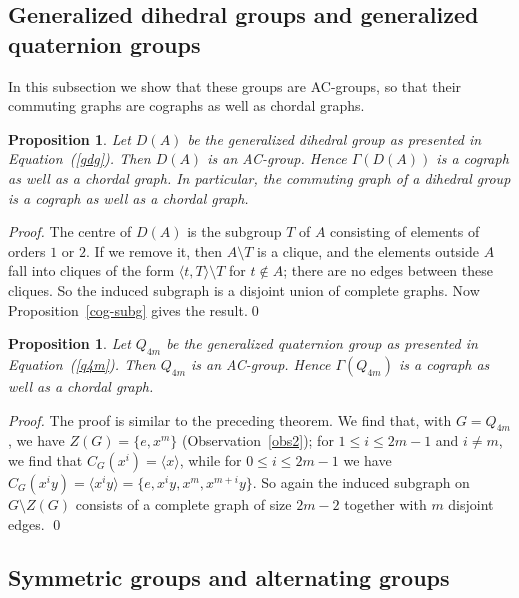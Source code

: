 \documentclass{elsarticle}
\newtheorem{prop}[theorem]{Proposition}
\begin{document}
\subsection{Generalized dihedral groups and generalized quaternion groups}

In this subsection we show that these groups are AC-groups, so that their
commuting graphs are cographs as well as chordal graphs.

\begin{prop}\label{gdg-thm}
Let $D(A)$ be the generalized dihedral group as presented in
Equation~(\ref{gdg}). Then $D(A)$ is an AC-group. Hence $\Gamma(D(A))$ is a
cograph as well as a chordal graph. In particular, the commuting graph of a
dihedral group is a cograph as well as a chordal graph.
\end{prop}

\begin{proof}
The centre of $D(A)$ is the subgroup $T$ of $A$ consisting of elements of orders $1$ or $2$. If we remove it, then $A\setminus T$ is a clique, and the elements outside $A$ fall into cliques of the form $\langle t,T\rangle\setminus T$ for $t\notin A$; there are no edges between these cliques. So the induced subgraph is a disjoint union of complete graphs. Now Proposition~\ref{cog-subg} gives the
result.\qed
\end{proof}

\begin{prop}
Let $Q_{4m}$ be the generalized quaternion group as presented in
Equation~(\ref{q4m}). Then $Q_{4m}$ is an AC-group. Hence $\Gamma(Q_{4m})$ is a
cograph as well as a chordal graph.
\end{prop}

\begin{proof}
The proof is similar to the preceding theorem. We find that, with $G=Q_{4m}$,
we have $Z(G)=\{e,x^m\}$ (Observation~\ref{obs2}); for
$1\le i\le 2m-1$ and $i\ne m$, we find that
$C_G(x^i)=\langle x\rangle$, while for $0\le i\le 2m-1$ we have
$C_G(x^iy)=\langle x^iy\rangle=\{e,x^iy,x^m,x^{m+i}y\}$. So again the
induced subgraph on $G\setminus Z(G)$ consists of a complete graph of size
$2m-2$ together with $m$ disjoint edges. \qed
\end{proof}




\subsection{Symmetric groups and alternating groups }
\end{document}
